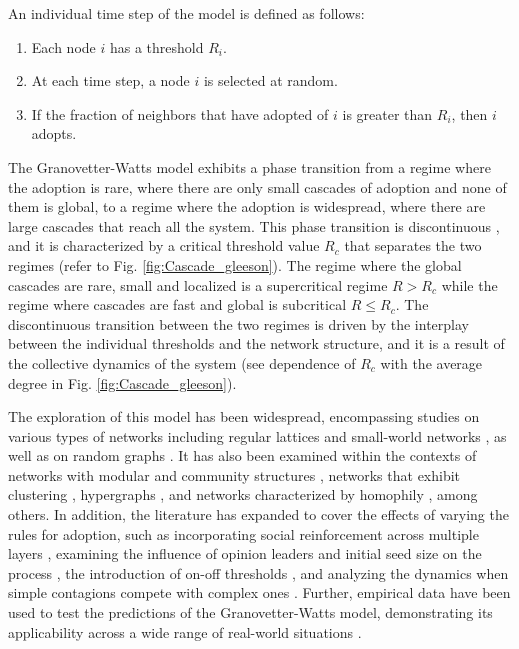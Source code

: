 \begin{theorem}
    \sffamily\small
    An individual time step of the model is defined as follows:
    \begin{enumerate}
        \item Each node $i$ has a threshold $R_i$.
        \item At each time step, a node $i$ is selected at random.
        \item If the fraction of neighbors that have adopted of $i$ is greater than $R_i$, then $i$ adopts.
    \end{enumerate}
\end{theorem}

The Granovetter-Watts model exhibits a phase transition from a regime where the adoption is rare, where there are only small cascades of adoption and none of them is global, to a regime where the adoption is widespread, where there are large cascades that reach all the system. This phase transition is discontinuous \cite{watts-2002,gleeson-2007}, and it is characterized by a critical threshold value $R_c$ that separates the two regimes (refer to Fig. \ref{fig:Cascade_gleeson}). The regime where the global cascades are rare, small and localized is a supercritical regime $R > R_c$ while the regime where cascades are fast and global is subcritical $R \leq R_c$. The  discontinuous transition between the two regimes is driven by the interplay between the individual thresholds and the network structure, and it is a result of the collective dynamics of the system (see dependence of $R_c$ with the average degree in Fig. \ref{fig:Cascade_gleeson}).

The exploration of this model has been widespread, encompassing studies on various types of networks including regular lattices and small-world networks \cite{centola-2007}, as well as on random graphs \cite{gleeson-2007}. It has also been examined within the contexts of networks with modular and community structures \cite{gleeson-2008}, networks that exhibit clustering \cite{hackett-2011,hackett-2013}, hypergraphs \cite{de-arruda-2020}, and networks characterized by homophily \cite{diaz-diaz-2022}, among others. In addition, the literature has expanded to cover the effects of varying the rules for adoption, such as incorporating social reinforcement across multiple layers \cite{chen-2018}, examining the influence of opinion leaders and initial seed size on the process \cite{liu-2018, singh-2013}, the introduction of on-off thresholds \cite{dodds-2013}, and analyzing the dynamics when simple contagions compete with complex ones \cite{czaplicka-2016, min-2018, diaz-diaz-2022}. Further, empirical data have been used to test the predictions of the Granovetter-Watts model, demonstrating its applicability across a wide range of real-world situations \cite{centola-2010, karimi-2013, karsai-2014, rosenthal-2015, karsai-2016, mnsted-2017, unicomb-2018, guilbeault-2021}.

